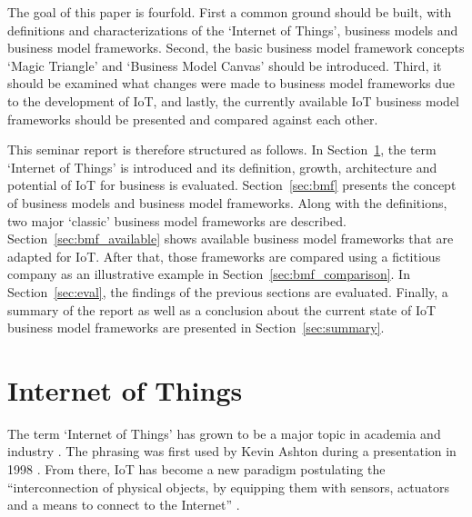 	The goal of this paper is fourfold. First a common ground should be built, with definitions and characterizations of the `Internet of Things', business models and business model frameworks. Second, the basic business model framework concepts `Magic Triangle' and `Business Model Canvas' should be introduced. Third, it should be examined what changes were made to business model frameworks due to the development of IoT, and lastly, the currently available IoT business model frameworks should be presented and compared against each other.

	This seminar report is therefore structured as follows. In Section~\ref{sec:iot}, the term `Internet of Things' is introduced and its definition, growth, architecture and potential of IoT for business is evaluated. Section~\ref{sec:bmf} presents the concept of business models and business model frameworks. Along with the definitions, two major `classic' business model frameworks are described. Section~\ref{sec:bmf_available} shows available business model frameworks that are adapted for IoT. After that, those frameworks are compared using a fictitious company as an illustrative example in Section~\ref{sec:bmf_comparison}. In Section~\ref{sec:eval}, the findings of the previous sections are evaluated. Finally, a summary of the report as well as a conclusion about the current state of IoT business model frameworks are presented in Section~\ref{sec:summary}. 
 
\section{Internet of Things}
\label{sec:iot}
	The term `Internet of Things' has grown to be a major topic in academia and industry \cite{ju}. The phrasing was first used by Kevin Ashton during a presentation in 1998 \cite{westerlund}. From there, IoT has become a new paradigm postulating the ``interconnection of physical objects, by equipping them with sensors, actuators and a means to connect to the Internet'' \cite[p.~672]{dijkman}.

